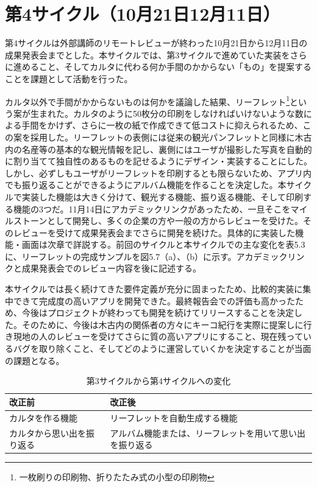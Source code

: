 \section{第4サイクル（10月21日12月11日）}
第4サイクルは外部講師のリモートレビューが終わった10月21日から12月11日の成果発表会までとした。本サイクルでは、第3サイクルで進めていた実装をさらに進めること、そしてカルタに代わる何か手間のかからない「もの」を提案することを課題として活動を行った。
\par カルタ以外で手間がかからないものは何かを議論した結果、リーフレット\footnote{一枚刷りの印刷物、折りたたみ式の小型の印刷物}という案が生まれた。カルタのように50枚分の印刷をしなければいけないような数による手間をかけず、さらに一枚の紙で作成できて低コストに抑えられるため、この案を採用した。リーフレットの表側には従来の観光パンフレットと同様に木古内の名産等の基本的な観光情報を記し、裏側にはユーザが撮影した写真を自動的に割り当てて独自性のあるものを記せるようにデザイン・実装することにした。しかし、必ずしもユーザがリーフレットを印刷するとも限らないため、アプリ内でも振り返ることができるようにアルバム機能を作ることを決定した。本サイクルで実装した機能は大きく分けて、観光する機能、振り返る機能、そして印刷する機能の3つだ。11月14日にアカデミックリンクがあったため、一旦そこをマイルストーンとして開発し、多くの企業の方や一般の方からレビューを受けた。そのレビューを受けて成果発表会までさらに開発を続けた。具体的に実装した機能・画面は次章で詳説する。前回のサイクルと本サイクルでの主な変化を表5.3に、リーフレットの完成サンプルを図5.7（a）、（b）に示す。アカデミックリンクと成果発表会でのレビュー内容を後に記述する。
\par 本サイクルでは長く続けてきた要件定義が充分に固まったため、比較的実装に集中できて完成度の高いアプリを開発できた。最終報告会での評価も高かったため、今後はプロジェクトが終わっても開発を続けてリリースすることを決定した。そのために、今後は木古内の関係者の方々にキーコ紀行を実際に提案しに行き現地の人のレビューを受けてさらに質の高いアプリにすること、現在残っているバグを取り除くこと、そしてどのように運営していくかを決定することが当面の課題となる。

\begin{table}[htb]
\centering
\addtocounter{table}{+0}
\caption{第3サイクルから第4サイクルへの変化}
  \begin{tabular}{|l|l|} \hline
    改正前&改正後  \\ \hline 
    カルタを作る機能 & \parbox{20zw}{リーフレットを自動生成する機能} \\  \hline
    カルタから思い出を振り返る &\parbox{20zw}{アルバム機能または、リーフレットを用いて思い出を振り返る}\rule[-6mm]{0mm}{14mm}\\ \hline
  \end{tabular} 
\end{table}

